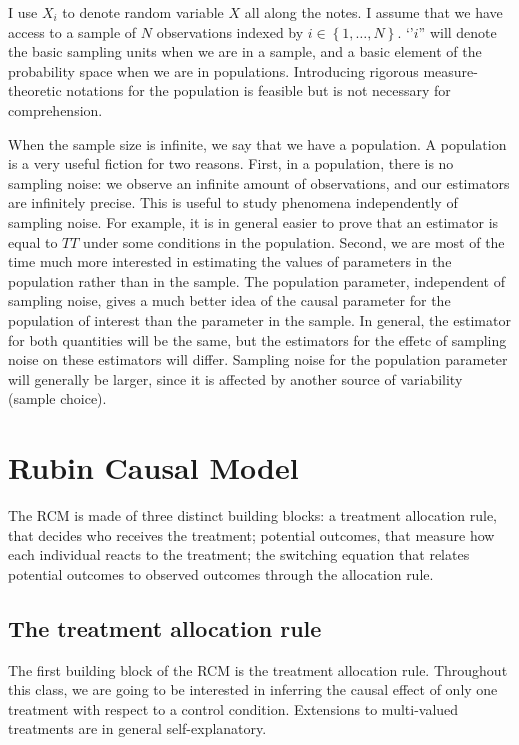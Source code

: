 \documentclass[]{book}
\theoremstyle{definition}
\theoremstyle{definition}
\theoremstyle{definition}
\theoremstyle{remark}
\begin{document}
I use \(X_i\) to denote random variable \(X\) all along the notes. I
assume that we have access to a sample of \(N\) observations indexed by
\(i\in\left\{1,\dots,N\right\}\). `'\(i\)'' will denote the basic
sampling units when we are in a sample, and a basic element of the
probability space when we are in populations. Introducing rigorous
measure-theoretic notations for the population is feasible but is not
necessary for comprehension.

When the sample size is infinite, we say that we have a population. A
population is a very useful fiction for two reasons. First, in a
population, there is no sampling noise: we observe an infinite amount of
observations, and our estimators are infinitely precise. This is useful
to study phenomena independently of sampling noise. For example, it is
in general easier to prove that an estimator is equal to \(TT\) under
some conditions in the population. Second, we are most of the time much
more interested in estimating the values of parameters in the population
rather than in the sample. The population parameter, independent of
sampling noise, gives a much better idea of the causal parameter for the
population of interest than the parameter in the sample. In general, the
estimator for both quantities will be the same, but the estimators for
the effetc of sampling noise on these estimators will differ. Sampling
noise for the population parameter will generally be larger, since it is
affected by another source of variability (sample choice).

\section{Rubin Causal Model}\label{rubin-causal-model}

The RCM is made of three distinct building blocks: a treatment
allocation rule, that decides who receives the treatment; potential
outcomes, that measure how each individual reacts to the treatment; the
switching equation that relates potential outcomes to observed outcomes
through the allocation rule.

\subsection{The treatment allocation
rule}\label{the-treatment-allocation-rule}

The first building block of the RCM is the treatment allocation rule.
Throughout this class, we are going to be interested in inferring the
causal effect of only one treatment with respect to a control condition.
Extensions to multi-valued treatments are in general self-explanatory.
\end{document}
